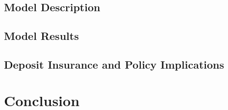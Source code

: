 \documentclass[12pt]{article}
\begin{document}
\begin{doublespace}
\subsection{Model Description}
\subsection{Model Results}

\subsection{Deposit Insurance and Policy Implications}

\section{Conclusion}
\end{doublespace}


\end{document}
